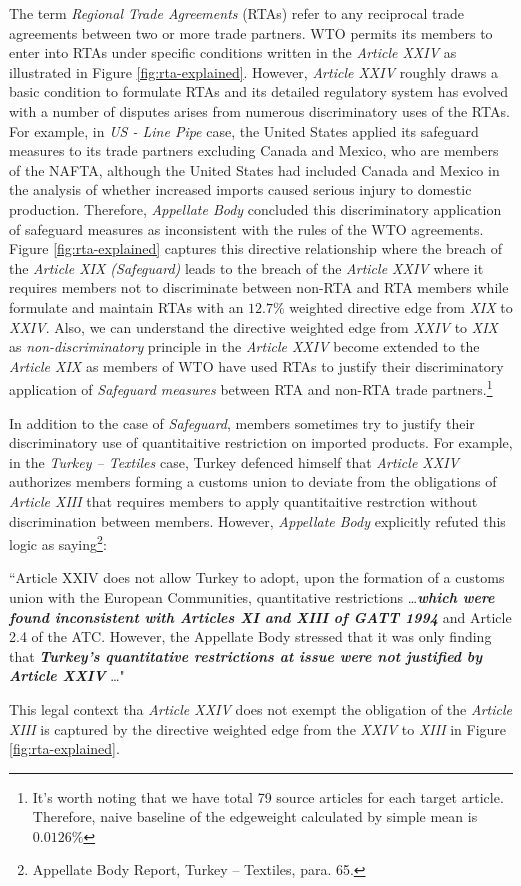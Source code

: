 The term \textit{Regional Trade Agreements} (RTAs)
refer to any reciprocal trade agreements between two or more trade partners. 
WTO permits its members to enter into RTAs under specific conditions written in the \textit{Article XXIV} 
as illustrated in 
Figure \ref{fig:rta-explained}.
However, \textit{Article XXIV} roughly draws a basic condition to formulate RTAs and its 
detailed regulatory system has evolved with a number of disputes arises 
from numerous discriminatory uses of the RTAs. For example,
in \textit{US - Line Pipe} case, 
the United States applied its safeguard measures to its trade partners excluding Canada and Mexico, who are members of the NAFTA, although 
the United States had included Canada and Mexico in the analysis of whether increased imports caused serious injury to domestic production.
Therefore, \textit{Appellate Body} concluded this discriminatory application of safeguard measures as inconsistent with the rules of the WTO agreements. 
Figure \ref{fig:rta-explained} 
captures this directive relationship 
where the breach of the \textit{Article XIX (Safeguard)} leads to the breach of the \textit{Article XXIV} 
where it requires members not to discriminate between non-RTA and RTA members while formulate and maintain RTAs with an $12.7\%$ weighted directive edge 
from \textit{XIX} to \textit{XXIV}. Also, we can understand the directive weighted edge from \textit{XXIV} to \textit{XIX} as \textit{non-discriminatory} 
principle in the \textit{Article XXIV} become 
extended to the \textit{Article XIX} as members of WTO have used RTAs to justify their discriminatory application of \textit{Safeguard measures} between RTA and non-RTA trade partners.\footnote{It's worth noting that we have total 79 source articles for each target article. Therefore, naive baseline of the edgeweight calculated by simple mean is $0.0126\%$}

In addition to the case of \textit{Safeguard}, 
members sometimes try to justify their discriminatory 
use of quantitaitive restriction on imported products. For example, in the \textit{Turkey – Textiles} case, Turkey defenced himself that \textit{Article XXIV} authorizes
members forming a customs union to deviate from the obligations of \textit{Article XIII} that requires members to apply quantitaitive restrction without discrimination between members. 
However, \textit{Appellate Body} explicitly refuted this logic as saying\footnote{Appellate Body Report, Turkey – Textiles, para. 65.}:
\begin{displayquote}[][]
    ``Article XXIV does not allow Turkey to adopt, upon the
    formation of a customs union with the European Communities, quantitative restrictions \ldots \textbf{\textit{which
    were found inconsistent with Articles XI and XIII of GATT 1994}} and Article 2.4 of the ATC.
    However, the Appellate Body stressed that it was only finding that \textbf{\textit{Turkey's quantitative
    restrictions at issue were not justified by Article XXIV}} \ldots"
\end{displayquote}
This legal context tha \textit{Article XXIV} does not exempt the obligation of the \textit{Article XIII} is captured by the directive weighted edge from the \textit{XXIV} to \textit{XIII} in Figure \ref{fig:rta-explained}.
